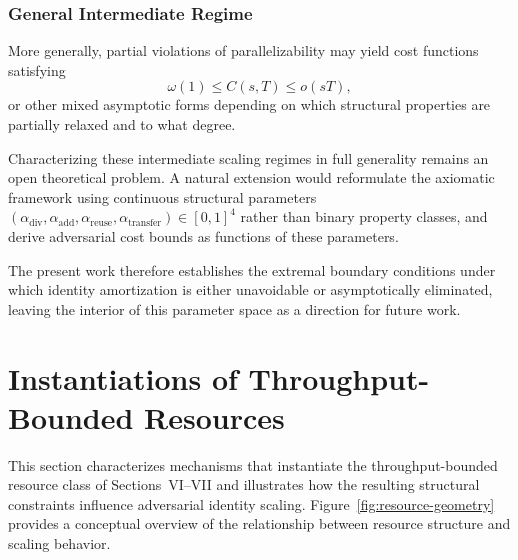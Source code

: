 \documentclass[journal]{IEEEtran}
\begin{document}
	\subsubsection*{General Intermediate Regime}
	More generally, partial violations of parallelizability
	may yield cost functions satisfying
	\[
	\omega(1) \le C(s,T) \le o(sT),
	\]
	or other mixed asymptotic forms depending on which
	structural properties are partially relaxed and to
	what degree.
	
	Characterizing these intermediate scaling regimes
	in full generality remains an open theoretical problem.
	A natural extension would reformulate the axiomatic
	framework using continuous structural parameters
	$(\alpha_{\text{div}}, \alpha_{\text{add}},
	\alpha_{\text{reuse}}, \alpha_{\text{transfer}}) \in [0,1]^4$
	rather than binary property classes, and derive
	adversarial cost bounds as functions of these parameters.
	
	The present work therefore establishes the extremal
	boundary conditions under which identity amortization
	is either unavoidable or asymptotically eliminated,
	leaving the interior of this parameter space as a
	direction for future work.
	
	
	
	
	\section{Instantiations of Throughput-Bounded Resources}
	
	This section characterizes mechanisms that instantiate
	the throughput-bounded resource class of Sections~VI--VII
	and illustrates how the resulting structural constraints
	influence adversarial identity scaling.
	Figure~\ref{fig:resource-geometry} provides a conceptual
	overview of the relationship between resource structure and
	scaling behavior.
	
\end{document}

